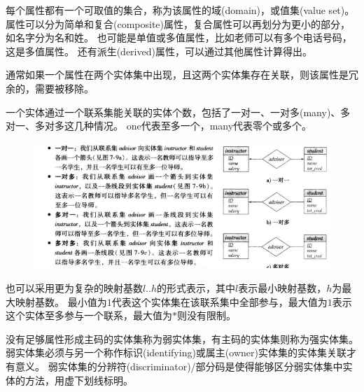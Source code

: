 \begin{definition}[属性]
每个属性都有一个可取值的集合，称为该属性的域(domain)，或值集(value set)。
属性可以分为简单和复合(composite)属性，复合属性可以再划分为更小的部分，如名字分为名和姓。
也可能是单值或多值属性，比如老师可以有多个电话号码，这是多值属性。
还有派生(derived)属性，可以通过其他属性计算得出。
\end{definition}
通常如果一个属性在两个实体集中出现，且这两个实体集存在关联，则该属性是冗余的，需要被移除。

\begin{definition}
一个实体通过一个联系集能关联的实体个数，包括了一对一、一对多(many)、多对一、多对多这几种情况。
one代表至多一个，many代表零个或多个。
\begin{figure}[H]
\centering
\includegraphics[width=\linewidth]{fig/mapping_radix.png}
\end{figure}
\end{definition}
也可以采用更为复杂的映射基数$l..h$的形式表示，其中$l$表示最小映射基数，$h$为最大映射基数。
最小值为$1$代表这个实体集在该联系集中全部参与，最大值为$1$表示这个实体至多参与一个联系，最大值为$*$则没有限制。

\begin{definition}[强弱实体集]
没有足够属性形成主码的实体集称为弱实体集，有主码的实体集则称为强实体集。
弱实体集必须与另一个称作标识(identifying)或属主(owner)实体集的实体集关联才有意义。
弱实体集的分辨符(discriminator)/部分码是使得能够区分弱实体集中实体的方法，用虚下划线标明。
\end{definition}

